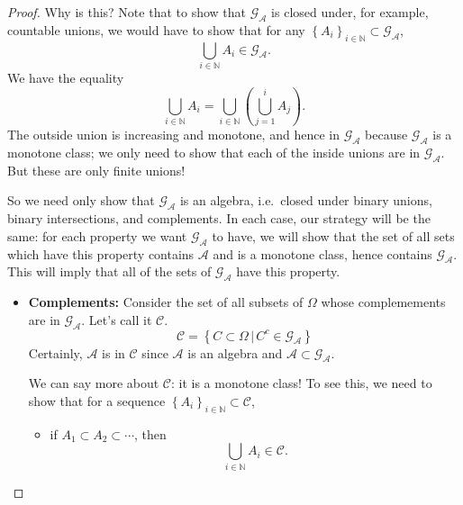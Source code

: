 \documentclass[a4paper]{scrartcl}
\newcommand{\N}{\mathbb{N}}
\theoremstyle{definition}
\theoremstyle{plain}
\theoremstyle{remark}
\begin{document}
\begin{proof}
  Why is this? Note that to show that $\mathcal{G}_{\mathcal{A}}$ is closed under, for example, countable unions, we would have to show that for any ${\left\{ A_{i} \right\}}_{i \in \N} \subset \mathcal{G}_{\mathcal{A}}$,
  \begin{equation*}
    \bigcup_{i \in \N} A_{i} \in \mathcal{G}_{\mathcal{A}}.
  \end{equation*}
  We have the equality
  \begin{equation*}
    \bigcup_{i \in \N} A_{i} = \bigcup_{i \in \N}\left( \bigcup_{j=1}^{i} A_{j} \right).
  \end{equation*}
  The outside union is increasing and monotone, and hence in $\mathcal{G}_{\mathcal{A}}$ because $\mathcal{G}_{\mathcal{A}}$ is a monotone class; we only need to show that each of the inside unions are in $\mathcal{G}_{\mathcal{A}}$. But these are only finite unions!

  So we need only show that $\mathcal{G}_{\mathcal{A}}$ is an algebra, i.e.\ closed under binary unions, binary intersections, and complements. In each case, our strategy will be the same: for each property we want $\mathcal{G}_{\mathcal{A}}$ to have, we will show that the set of all sets which have this property contains $\mathcal{A}$ and is a monotone class, hence contains $\mathcal{G}_{\mathcal{A}}$. This will imply that all of the sets of $\mathcal{G}_{\mathcal{A}}$ have this property.
  \begin{itemize}
    \item \textbf{Complements:} Consider the set of all subsets of $\Omega$ whose complemements are in $\mathcal{G}_{\mathcal{A}}$. Let's call it $\mathcal{C}$.
      \begin{equation*}
        \mathcal{C} = \left\{ C \subset \Omega\,\big|\, C^{c} \in \mathcal{G}_{\mathcal{A}} \right\}
      \end{equation*}
      Certainly, $\mathcal{A}$ is in $\mathcal{C}$ since $\mathcal{A}$ is an algebra and $\mathcal{A} \subset \mathcal{G}_{\mathcal{A}}$.

      We can say more about $\mathcal{C}$: it is a monotone class! To see this, we need to show that for a sequence ${\left\{ A_{i} \right\}}_{i \in \N} \subset \mathcal{C}$,
      \begin{itemize}
        \item if $A_{1} \subset A_{2} \subset \cdots$, then
          \begin{equation*}
            \bigcup_{i \in \N} A_{i} \in \mathcal{C}.
          \end{equation*}


\end{itemize}
\end{itemize}
\end{proof}
\end{document}
